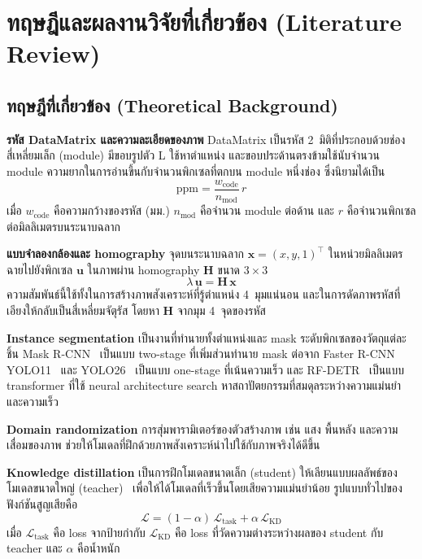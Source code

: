 \documentclass[20pt,a4paper]{article}
\begin{document}

\section{ทฤษฎีและผลงานวิจัยที่เกี่ยวข้อง (Literature Review)}

\subsection{ทฤษฎีที่เกี่ยวข้อง (Theoretical Background)}

\textbf{รหัส DataMatrix และความละเอียดของภาพ}
DataMatrix เป็นรหัส 2~มิติที่ประกอบด้วยช่องสี่เหลี่ยมเล็ก (module)
มีขอบรูปตัว L ใช้หาตำแหน่ง และขอบประด้านตรงข้ามใช้นับจำนวน module
ความยากในการอ่านขึ้นกับจำนวนพิกเซลที่ตกบน module หนึ่งช่อง
ซึ่งนิยามได้เป็น
\begin{equation}
\mathrm{ppm} = \frac{w_{\mathrm{code}}}{n_{\mathrm{mod}}}\, r
\label{eq:ppm}
\end{equation}
เมื่อ $w_{\mathrm{code}}$ คือความกว้างของรหัส (มม.)
$n_{\mathrm{mod}}$ คือจำนวน module ต่อด้าน
และ $r$ คือจำนวนพิกเซลต่อมิลลิเมตรบนระนาบฉลาก

\textbf{แบบจำลองกล้องและ homography}
จุดบนระนาบฉลาก $\mathbf{x} = (x, y, 1)^\top$ ในหน่วยมิลลิเมตร
ฉายไปยังพิกเซล $\mathbf{u}$ ในภาพผ่าน homography $\mathbf{H}$ ขนาด $3\times3$
\begin{equation}
\lambda\,\mathbf{u} = \mathbf{H}\,\mathbf{x}
\label{eq:homography}
\end{equation}
ความสัมพันธ์นี้ใช้ทั้งในการสร้างภาพสังเคราะห์ที่รู้ตำแหน่ง 4~มุมแน่นอน
และในการดัดภาพรหัสที่เอียงให้กลับเป็นสี่เหลี่ยมจัตุรัส
โดยหา $\mathbf{H}$ จากมุม 4~จุดของรหัส

\textbf{Instance segmentation}
เป็นงานที่ทำนายทั้งตำแหน่งและ mask ระดับพิกเซลของวัตถุแต่ละชิ้น
Mask R-CNN~\cite{he2017maskrcnn} เป็นแบบ two-stage
ที่เพิ่มส่วนทำนาย mask ต่อจาก Faster R-CNN
YOLO11~\cite{khanam2024yolov11} และ YOLO26~\cite{sapkota2025yolo26}
เป็นแบบ one-stage ที่เน้นความเร็ว
และ RF-DETR~\cite{robinson2026rfdetr} เป็นแบบ transformer
ที่ใช้ neural architecture search หาสถาปัตยกรรมที่สมดุลระหว่างความแม่นยำและความเร็ว

\textbf{Domain randomization}
การสุ่มพารามิเตอร์ของตัวสร้างภาพ เช่น แสง พื้นหลัง และความเสื่อมของภาพ
ช่วยให้โมเดลที่ฝึกด้วยภาพสังเคราะห์นำไปใช้กับภาพจริงได้ดีขึ้น~\cite{tremblay2018domain}

\textbf{Knowledge distillation}
เป็นการฝึกโมเดลขนาดเล็ก (student) ให้เลียนแบบผลลัพธ์ของโมเดลขนาดใหญ่ (teacher)~\cite{hinton2015distilling}
เพื่อให้ได้โมเดลที่เร็วขึ้นโดยเสียความแม่นยำน้อย
รูปแบบทั่วไปของฟังก์ชันสูญเสียคือ
\begin{equation}
\mathcal{L} = (1-\alpha)\,\mathcal{L}_{\mathrm{task}} + \alpha\,\mathcal{L}_{\mathrm{KD}}
\label{eq:kd}
\end{equation}
เมื่อ $\mathcal{L}_{\mathrm{task}}$ คือ loss จากป้ายกำกับ
$\mathcal{L}_{\mathrm{KD}}$ คือ loss ที่วัดความต่างระหว่างผลของ student กับ teacher
และ $\alpha$ คือน้ำหนัก
\end{document}
